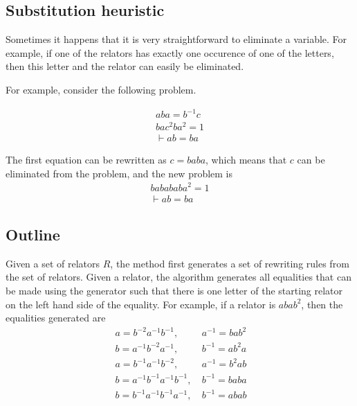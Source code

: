 \documentclass[12pt]{article} %
\theoremstyle{definition}
\theoremstyle{definition}
\theoremstyle{definition}
\theoremstyle{definition}
\theoremstyle{definition}
\theoremstyle{definition}
\begin{document}
\subsection{Substitution heuristic}\label{subst}
  Sometimes it happens that it is very straightforward to eliminate a variable.
  For example, if one of the relators has exactly one occurence of one of the
  letters, then this letter and the relator can easily be eliminated.

  For example, consider the following problem.

  \begin{equation}
    \begin{aligned}
      aba =b^{-1}c \\
      bac^2ba^2 = 1 \\
      \vdash ab=ba
    \end{aligned}
  \end{equation}

The first equation can be rewritten as $c = baba$, which means that $c$ can be eliminated
from the problem, and the new problem is
\begin{equation}
  \begin{aligned}
    babababa^2 = 1 \\
    \vdash ab=ba
  \end{aligned}
\end{equation}

\subsection{Outline}

  Given a set of relators $R$, the method first generates a set of rewriting rules
  from the set of relators. Given a relator, the algorithm generates all equalities
  that can be made using the generator such that there is one letter of the starting
  relator on the left hand side of the equality.
  For example, if a relator is $abab^2$, then the equalities generated are
  \begin{equation}\
    \begin{aligned}
      a = b^{-2}a^{-1}b^{-1}, \ & a^{-1} = bab^2 \\
      b = a^{-1}b^{-2}a^{-1},\ & b^{-1} = ab^2a \\
      a=b^{-1}a^{-1}b^{-2}, \ & a^{-1}=b^2ab \\
      b=a^{-1}b^{-1}a^{-1}b^{-1}, \  & b^{-1} = baba \\
      b=b^{-1}a^{-1}b^{-1}a^{-1}, \ & b^{-1} = abab
    \end{aligned}
  \end{equation}
\end{document}
